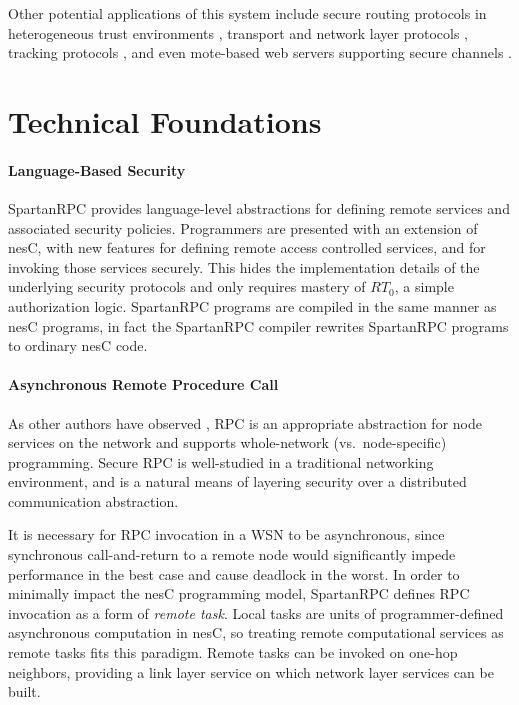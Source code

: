 Other potential applications of this system include secure routing protocols in heterogeneous
trust environments \cite{senroute-ahnj03}, transport and network layer protocols
\cite{perillo-heinzelman-2005}, tracking protocols \cite{brooks-ramanathan-sayeed-2003}, and
even mote-based web servers supporting secure channels \cite{1049776}.

\section{Technical Foundations}

\paragraph{Language-Based Security} SpartanRPC provides language-level abstractions for defining
remote services and associated security policies. Programmers are presented with an extension of
nesC, with new features for defining remote access controlled services, and for invoking those
services securely. This hides the implementation details of the underlying security protocols
and only requires mastery of $RT_0$, a simple authorization logic. SpartanRPC programs are
compiled in the same manner as nesC programs, in fact the SpartanRPC compiler rewrites
SpartanRPC programs to ordinary nesC code.

\paragraph{Asynchronous Remote Procedure Call} As other authors have observed
\cite{may-tinyrpc-2007}, RPC is an appropriate abstraction for node services on the network and
supports whole-network (vs.~node-specific) programming. Secure RPC is well-studied in a
traditional networking environment, and is a natural means of layering security over a
distributed communication abstraction.

It is necessary for RPC invocation in a WSN to be asynchronous, since synchronous
call-and-return to a remote node would significantly impede performance in the best case and
cause deadlock in the worst. In order to minimally impact the nesC programming model, SpartanRPC
defines RPC invocation as a form of \emph{remote task}. Local tasks are units of
programmer-defined asynchronous computation in nesC, so treating remote computational services
as remote tasks fits this paradigm. Remote tasks can be invoked on one-hop neighbors, providing
a link layer service on which network layer services can be built.

